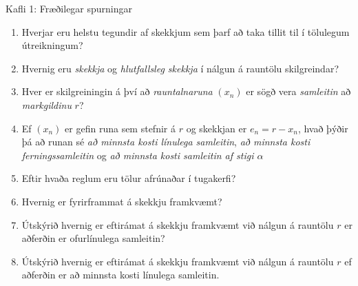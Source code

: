 % 
% 
% 

%


\begin{frame}{Kafli 1: Fræðilegar spurningar}
  \begin{enumerate}
  \item  Hverjar eru helstu tegundir af skekkjum sem þarf að taka
    tillit til í tölulegum útreikningum?
  \item  Hvernig eru {\it skekkja} og {\it hlutfallsleg skekkja} í nálgun á
    rauntölu skilgreindar?
  \item  Hver er skilgreiningin á því að {\it rauntalnaruna} $(x_n)$
    er sögð vera {\it samleitin} að {\it  markgildinu} $r$?
  \item  Ef $(x_n)$ er gefin runa sem stefnir á $r$ og skekkjan
er  $e_n=r-x_n$, hvað þýðir  þá að runan sé  
{\it  að minnsta kosti línulega samleitin}, 
{\it að minnsta kosti  ferningssamleitin} og  
{\it að minnsta kosti samleitin af stigi $\alpha$} 
  \item  Eftir hvaða reglum eru tölur afrúnaðar í tugakerfi?
  \item  Hvernig er fyrirframmat á skekkju framkvæmt?
  \item  Útskýrið hvernig er eftirámat á skekkju framkvæmt við nálgun á
    rauntölu $r$ er aðferðin er ofurlínulega samleitin?
  \item  Útskýrið hvernig er eftirámat á skekkju framkvæmt við nálgun á
    rauntölu $r$ ef aðferðin er að minnsta kosti línulega samleitin.
   \end{enumerate}
\end{frame}

